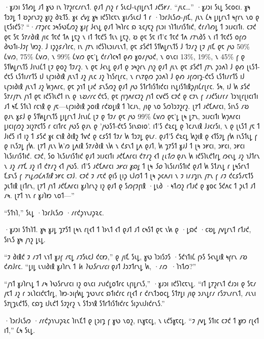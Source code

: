 ·𐑣𐑨𐑮𐑦 𐑕𐑑𐑺𐑛 𐑨𐑑 𐑣𐑻 𐑦𐑯 𐑐𐑳𐑟𐑩𐑤𐑥𐑩𐑯𐑑. 𐑞𐑨𐑑 𐑢𐑪𐑟 𐑩 𐑕𐑧𐑤𐑓-𐑧𐑝𐑦𐑛𐑩𐑯𐑑 𐑨𐑒𐑕𐑾𐑥. “𐑢𐑧𐑤…” ·𐑣𐑨𐑮𐑦 𐑕𐑧𐑛 𐑕𐑤𐑴𐑤𐑦. 𐑣𐑰 𐑑𐑮𐑲𐑛 𐑑 𐑹𐑜𐑩𐑯𐑲𐑟 𐑣𐑦𐑟 𐑔𐑷𐑑𐑕. 𐑣𐑬 \emph{𐑒𐑫𐑛} 𐑣𐑰 𐑦𐑒𐑕𐑐𐑤𐑱𐑯 𐑣𐑦𐑥𐑕𐑧𐑤𐑓 𐑑 𐑩 ·𐑐𐑮𐑩𐑓𐑧𐑕𐑼-𐑢𐑦𐑗, 𐑢𐑧𐑯 𐑖𐑰 𐑛𐑦𐑛𐑩𐑯𐑑 𐑰𐑝𐑩𐑯 𐑯𐑴 𐑞 𐑚𐑱𐑕𐑦𐑒𐑕? “·𐑥𐑳𐑜𐑩𐑤 𐑮𐑰𐑕𐑻𐑗𐑼𐑟 𐑣𐑨𐑝 𐑓𐑬𐑯𐑛 𐑞𐑨𐑑 𐑐𐑰𐑐𐑩𐑤 𐑸 𐑷𐑤𐑢𐑱𐑟 𐑝𐑧𐑮𐑦 𐑪𐑐𐑑𐑦𐑥𐑦𐑕𐑑𐑦𐑒, 𐑒𐑩𐑥𐑐𐑺𐑛 𐑑 𐑮𐑦𐑨𐑤𐑦𐑑𐑦. 𐑤𐑲𐑒 𐑞𐑱 𐑕𐑱 𐑕𐑳𐑥𐑔𐑦𐑙 𐑢𐑦𐑤 𐑑𐑱𐑒 𐑑𐑵 𐑛𐑱𐑟 𐑯 𐑦𐑑 𐑑𐑱𐑒𐑕 𐑑𐑧𐑯 𐑛𐑱𐑟, 𐑹 𐑞𐑱 𐑕𐑱 𐑦𐑑'𐑤 𐑑𐑱𐑒 𐑑𐑵 𐑥𐑳𐑯𐑔𐑕 𐑯 𐑦𐑑 𐑑𐑱𐑒𐑕 𐑴𐑝𐑼 𐑔𐑻𐑑𐑦-𐑓𐑲𐑝 𐑘𐑽𐑟. 𐑓 𐑦𐑜𐑟𐑭𐑥𐑐𐑩𐑤, 𐑦𐑯 𐑢𐑳𐑯 𐑦𐑒𐑕𐑐𐑧𐑮𐑦𐑥𐑧𐑯𐑑, 𐑞𐑱 𐑭𐑕𐑒𐑑 𐑕𐑑𐑿𐑛𐑩𐑯𐑑𐑕 𐑓 𐑑𐑲𐑥𐑟 𐑚𐑲 𐑢𐑦𐑗 𐑞𐑱 𐑢𐑻 50\% 𐑖𐑫𐑼, 75\% 𐑖𐑫𐑼, 𐑯 99\% 𐑖𐑫𐑼 𐑞𐑱'𐑛 𐑒𐑩𐑥𐑐𐑤𐑰𐑑 𐑞𐑺 𐑣𐑴𐑥𐑢𐑻𐑒, 𐑯 𐑴𐑯𐑤𐑦 13\%, 19\%, 𐑯 45\% 𐑝 𐑞 𐑕𐑑𐑿𐑛𐑩𐑯𐑑𐑕 𐑓𐑦𐑯𐑦𐑖𐑑 𐑚𐑲 𐑞𐑴𐑟 𐑑𐑲𐑥𐑟. 𐑯 𐑞𐑱 𐑓𐑬𐑯𐑛 𐑞𐑨𐑑 𐑞 𐑮𐑰𐑟𐑩𐑯 𐑢𐑪𐑟 𐑞𐑨𐑑 𐑢𐑧𐑯 𐑞𐑱 𐑭𐑕𐑒𐑑 𐑢𐑳𐑯 𐑜𐑮𐑵𐑐 𐑓 𐑞𐑺 𐑚𐑧𐑕𐑑-𐑒𐑱𐑕 𐑧𐑕𐑑𐑦𐑥𐑩𐑑𐑕 𐑦𐑓 𐑧𐑝𐑮𐑦𐑔𐑦𐑙 𐑢𐑧𐑯𐑑 𐑨𐑟 𐑢𐑧𐑤 𐑨𐑟 𐑐𐑪𐑕𐑩𐑚𐑩𐑤, 𐑯 𐑩𐑯𐑳𐑞𐑼 𐑜𐑮𐑵𐑐 𐑓 𐑞𐑺 𐑨𐑝𐑼𐑦𐑡-𐑒𐑱𐑕 𐑧𐑕𐑑𐑦𐑥𐑩𐑑𐑕 𐑦𐑓 𐑧𐑝𐑮𐑦𐑔𐑦𐑙 𐑢𐑧𐑯𐑑 𐑨𐑟 𐑿𐑠𐑵𐑩𐑤, 𐑞𐑱 𐑜𐑪𐑑 𐑚𐑨𐑒 𐑭𐑯𐑕𐑼𐑟 𐑞𐑨𐑑 𐑢𐑻 𐑕𐑑𐑩𐑑𐑦𐑕𐑑𐑦𐑒𐑤𐑦 𐑦𐑯𐑛𐑦𐑕𐑑𐑦𐑙𐑜𐑢𐑦𐑖𐑩𐑚𐑩𐑤. 𐑕𐑰, 𐑦𐑓 𐑿 𐑭𐑕𐑒 𐑕𐑳𐑥𐑢𐑳𐑯 𐑢𐑪𐑑 𐑞𐑱 𐑦𐑒𐑕𐑐𐑧𐑒𐑑 𐑦𐑯 𐑞 \emph{𐑯𐑹𐑥𐑩𐑤} 𐑒𐑱𐑕, 𐑞𐑱 𐑝𐑦𐑠𐑵𐑩𐑤𐑲𐑟 𐑢𐑪𐑑 𐑤𐑫𐑒𐑕 𐑤𐑲𐑒 𐑞 𐑤𐑲𐑯 𐑝 𐑥𐑨𐑒𐑕𐑦𐑥𐑩𐑥 𐑐𐑮𐑪𐑚𐑩𐑚𐑦𐑤𐑦𐑑𐑦 𐑨𐑑 𐑰𐑗 𐑕𐑑𐑧𐑐 𐑩𐑤𐑪𐑙 𐑞 𐑢𐑱—𐑧𐑝𐑮𐑦𐑔𐑦𐑙 𐑜𐑴𐑦𐑙 𐑩𐑒𐑹𐑛𐑦𐑙 𐑑 𐑐𐑤𐑨𐑯, 𐑢𐑦𐑞 𐑯𐑴 𐑕𐑼𐑐𐑮𐑲𐑟𐑩𐑟. 𐑚𐑳𐑑 𐑨𐑒𐑗𐑵𐑩𐑤𐑦, 𐑕𐑦𐑯𐑕 𐑥𐑹 𐑞𐑨𐑯 𐑣𐑭𐑓 𐑞 𐑕𐑑𐑿𐑛𐑩𐑯𐑑𐑕 𐑛𐑦𐑛𐑩𐑯𐑑 𐑓𐑦𐑯𐑦𐑖 𐑚𐑲 𐑞 𐑑𐑲𐑥 𐑞𐑱 𐑢𐑻 99\% 𐑖𐑫𐑼 𐑞𐑱'𐑛 𐑚𐑰 𐑛𐑳𐑯, 𐑮𐑦𐑨𐑤𐑦𐑑𐑦 𐑿𐑠𐑵𐑩𐑤𐑦 𐑛𐑦𐑤𐑦𐑝𐑼𐑟 𐑮𐑦𐑟𐑳𐑤𐑑𐑕 𐑩 𐑤𐑦𐑑𐑩𐑤 𐑢𐑻𐑕 𐑞𐑨𐑯 𐑞 '𐑢𐑻𐑕𐑑-𐑒𐑱𐑕 𐑕𐑦𐑯𐑸𐑦𐑴'. 𐑦𐑑'𐑕 𐑒𐑷𐑤𐑛 𐑞 𐑐𐑤𐑨𐑯𐑦𐑙 𐑓𐑨𐑤𐑩𐑕𐑦, 𐑯 𐑞 𐑚𐑧𐑕𐑑 𐑢𐑱 𐑑 𐑓𐑦𐑒𐑕 𐑦𐑑 𐑦𐑟 𐑑 𐑭𐑕𐑒 𐑣𐑬 𐑤𐑪𐑙 𐑔𐑦𐑙𐑟 𐑑𐑫𐑒 𐑞 𐑤𐑭𐑕𐑑 𐑑𐑲𐑥 𐑿 𐑑𐑮𐑲𐑛 𐑞𐑧𐑥. 𐑞𐑨𐑑'𐑕 𐑒𐑷𐑤𐑛 𐑿𐑟𐑦𐑙 𐑞 𐑬𐑑𐑕𐑲𐑛 𐑝𐑿 𐑦𐑯𐑕𐑑𐑧𐑛 𐑝 𐑞 𐑦𐑯𐑕𐑲𐑛 𐑝𐑿. 𐑚𐑳𐑑 𐑢𐑧𐑯 𐑿'𐑼 𐑛𐑵𐑦𐑙 𐑕𐑳𐑥𐑔𐑦𐑙 𐑯𐑿 𐑯 𐑒𐑭𐑯𐑑 𐑛𐑵 𐑞𐑨𐑑, 𐑿 𐑡𐑳𐑕𐑑 𐑣𐑨𐑓 𐑑 𐑚𐑰 𐑮𐑾𐑤𐑦, 𐑮𐑾𐑤𐑦, 𐑮𐑾𐑤𐑦 𐑐𐑧𐑕𐑦𐑥𐑦𐑕𐑑𐑦𐑒. 𐑤𐑲𐑒, 𐑕𐑴 𐑐𐑧𐑕𐑦𐑥𐑦𐑕𐑑𐑦𐑒 𐑞𐑨𐑑 𐑮𐑦𐑨𐑤𐑦𐑑𐑦 𐑨𐑒𐑗𐑵𐑩𐑤𐑦 𐑒𐑳𐑥𐑟 𐑬𐑑 \emph{𐑚𐑧𐑑𐑼} 𐑞𐑨𐑯 𐑿 𐑦𐑒𐑕𐑐𐑧𐑒𐑑𐑩𐑛 𐑼𐑬𐑯𐑛 𐑨𐑟 𐑪𐑓𐑑𐑩𐑯 𐑯 𐑨𐑟 𐑥𐑳𐑗 𐑨𐑟 𐑦𐑑 𐑒𐑳𐑥𐑟 𐑬𐑑 𐑢𐑻𐑕. 𐑦𐑑'𐑕 𐑨𐑒𐑗𐑵𐑩𐑤𐑦 \emph{𐑮𐑾𐑤𐑦 𐑣𐑸𐑛} 𐑑 𐑚𐑰 \emph{𐑕𐑴} 𐑐𐑧𐑕𐑦𐑥𐑦𐑕𐑑𐑦𐑒 𐑞𐑨𐑑 𐑿 𐑕𐑑𐑨𐑯𐑛 𐑩 𐑛𐑰𐑕𐑩𐑯𐑑 𐑗𐑭𐑯𐑕 𐑝 \emph{𐑳𐑯𐑛𐑼𐑖𐑵𐑑𐑦𐑙} 𐑮𐑾𐑤 𐑤𐑲𐑓. 𐑤𐑲𐑒 𐑲 𐑥𐑱𐑒 𐑞𐑦𐑕 𐑚𐑦𐑜 𐑧𐑓𐑼𐑑 𐑑 𐑚𐑰 𐑜𐑤𐑵𐑥𐑦 𐑯 𐑲 𐑦𐑥𐑨𐑡𐑦𐑯 𐑢𐑳𐑯 𐑝 𐑥𐑲 𐑒𐑤𐑭𐑕𐑥𐑱𐑑𐑕 𐑜𐑧𐑑𐑦𐑙 𐑚𐑦𐑑𐑩𐑯, 𐑚𐑳𐑑 𐑢𐑪𐑑 𐑨𐑒𐑗𐑵𐑩𐑤𐑦 𐑣𐑨𐑐𐑩𐑯𐑟 𐑦𐑟 𐑞𐑨𐑑 𐑞 𐑕𐑼𐑝𐑲𐑝𐑦𐑙 ·𐑛𐑧𐑔 ·𐑰𐑑𐑼𐑟 𐑩𐑑𐑨𐑒 𐑞 𐑣𐑴𐑤 𐑕𐑒𐑵𐑤 𐑑 𐑜𐑧𐑑 𐑨𐑑 𐑥𐑰. 𐑚𐑳𐑑 𐑪𐑯 𐑩 𐑣𐑨𐑐𐑽 𐑯𐑴𐑑—”

“𐑕𐑑𐑪𐑐,” 𐑕𐑧𐑛 ·𐑐𐑮𐑩𐑓𐑧𐑕𐑼 ·𐑥𐑩𐑒𐑜𐑪𐑯𐑨𐑜𐑷𐑤.

·𐑣𐑨𐑮𐑦 𐑕𐑑𐑪𐑐𐑑. 𐑣𐑰 𐑣𐑨𐑛 𐑡𐑳𐑕𐑑 𐑚𐑰𐑯 𐑩𐑚𐑬𐑑 𐑑 𐑐𐑶𐑯𐑑 𐑬𐑑 𐑞𐑨𐑑 𐑨𐑑 𐑤𐑰𐑕𐑑 𐑞𐑱 𐑯𐑿 𐑞 ·𐑛𐑸𐑒 ·𐑤𐑹𐑛 𐑢𐑫𐑛𐑩𐑯𐑑 𐑩𐑑𐑨𐑒, 𐑕𐑦𐑯𐑕 𐑣𐑰 𐑢𐑪𐑟 𐑛𐑧𐑛.

“𐑲 𐑔𐑦𐑙𐑒 𐑲 𐑥𐑲𐑑 𐑯𐑪𐑑 𐑣𐑨𐑝 𐑥𐑱𐑛 𐑥𐑲𐑕𐑧𐑤𐑓 𐑒𐑤𐑽,” 𐑞 𐑢𐑦𐑗 𐑕𐑧𐑛, 𐑣𐑻 𐑐𐑮𐑦𐑕𐑲𐑕 ·𐑕𐑒𐑪𐑑𐑦𐑖 𐑝𐑶𐑕 𐑕𐑬𐑯𐑛𐑦𐑙 𐑰𐑝𐑩𐑯 𐑥𐑹 𐑒𐑺𐑓𐑩𐑤. “𐑛𐑦𐑛 𐑧𐑯𐑦𐑔𐑦𐑙 𐑣𐑨𐑐𐑩𐑯 𐑑 \emph{𐑿 𐑐𐑻𐑕𐑩𐑯𐑩𐑤𐑦} 𐑞𐑨𐑑 𐑓𐑮𐑲𐑑𐑩𐑯𐑛 𐑿, ·𐑥𐑼~·𐑐𐑪𐑑𐑼?”

“𐑢𐑪𐑑 𐑣𐑨𐑐𐑩𐑯𐑛 𐑑 𐑥𐑰 𐑐𐑻𐑕𐑩𐑯𐑩𐑤𐑦 𐑦𐑟 𐑴𐑯𐑤𐑦 𐑨𐑯𐑦𐑒𐑛𐑴𐑑𐑩𐑤 𐑧𐑝𐑦𐑛𐑩𐑯𐑕,” ·𐑣𐑨𐑮𐑦 𐑦𐑒𐑕𐑐𐑤𐑱𐑯𐑛. “𐑦𐑑 𐑛𐑳𐑟𐑩𐑯𐑑 𐑒𐑨𐑮𐑦 𐑞 𐑕𐑱𐑥 𐑢𐑱𐑑 𐑨𐑟 𐑩 𐑮𐑧𐑐𐑤𐑦𐑒𐑱𐑑𐑩𐑛, 𐑐𐑽-𐑮𐑦𐑝𐑿𐑛 𐑡𐑻𐑯𐑩𐑤 𐑸𐑑𐑦𐑒𐑩𐑤 𐑩𐑚𐑬𐑑 𐑩 𐑒𐑩𐑯𐑑𐑮𐑴𐑤𐑛 𐑕𐑑𐑳𐑛𐑦 𐑢𐑦𐑞 𐑮𐑨𐑯𐑛𐑩𐑥 𐑩𐑕𐑲𐑯𐑥𐑩𐑯𐑑, 𐑥𐑧𐑯𐑦 𐑕𐑳𐑚𐑡𐑧𐑒𐑑𐑕, 𐑤𐑸𐑡 𐑦𐑓𐑧𐑒𐑑 𐑕𐑲𐑟𐑩𐑟 𐑯 𐑕𐑑𐑮𐑪𐑙 𐑕𐑑𐑩𐑑𐑦𐑕𐑑𐑦𐑒𐑩𐑤 𐑕𐑦𐑜𐑯𐑦𐑓𐑦𐑒𐑩𐑯𐑕.”

·𐑐𐑮𐑩𐑓𐑧𐑕𐑼 ·𐑥𐑩𐑒𐑜𐑪𐑯𐑨𐑜𐑷𐑤 𐑐𐑦𐑯𐑗𐑑 𐑞 𐑚𐑮𐑦𐑡 𐑝 𐑣𐑻 𐑯𐑴𐑟, 𐑦𐑯𐑣𐑱𐑤𐑛, 𐑯 𐑧𐑒𐑕𐑣𐑱𐑤𐑛. “𐑲 𐑢𐑫𐑛 𐑕𐑑𐑦𐑤 𐑤𐑲𐑒 𐑑 𐑣𐑽 𐑩𐑚𐑬𐑑 𐑦𐑑,” 𐑖𐑰 𐑕𐑧𐑛.

